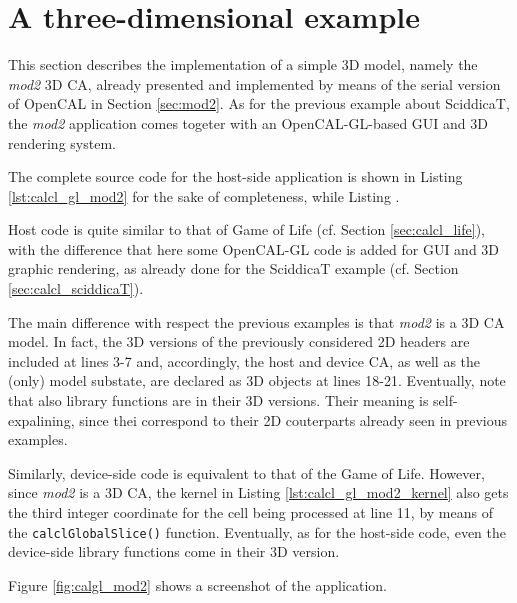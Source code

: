 \section{A three-dimensional example}

This section describes the implementation of a simple 3D model, namely
the \emph{mod2} 3D CA, already presented and implemented by means of
the serial version of OpenCAL in Section \ref{sec:mod2}. As for the
previous example about SciddicaT, the \emph{mod2} application comes
togeter with an OpenCAL-GL-based GUI and 3D rendering system.

The complete source code for the host-side application is shown in
Listing \ref{lst:calcl_gl_mod2} for the sake of completeness, while Listing .







Host code is quite similar to that of Game of Life (cf. Section
\ref{sec:calcl_life}), with the difference that here some OpenCAL-GL
code is added for GUI and 3D graphic rendering, as already done for
the SciddicaT example (cf. Section \ref{sec:calcl_sciddicaT}).

The main difference with respect the previous examples is that
\emph{mod2} is a 3D CA model. In fact, the 3D versions of the
previously considered 2D headers are included at lines 3-7 and,
accordingly, the host and device CA, as well as the (only) model
substate, are declared as 3D objects at lines 18-21. Eventually, note
that also library functions are in their 3D versions. Their meaning is
self-expalining, since thei correspond to their 2D couterparts already
seen in previous examples.

Similarly, device-side code is equivalent to that of the Game of
Life. However, since \emph{mod2} is a 3D CA, the kernel in Listing
\ref{lst:calcl_gl_mod2_kernel} also gets the third integer coordinate
for the cell being processed at line 11, by means of the
\verb'calclGlobalSlice()' function. Eventually, as for the host-side
code, even the device-side library functions come in their 3D version.

Figure \ref{fig:calgl_mod2} shows a screenshot of the application.



